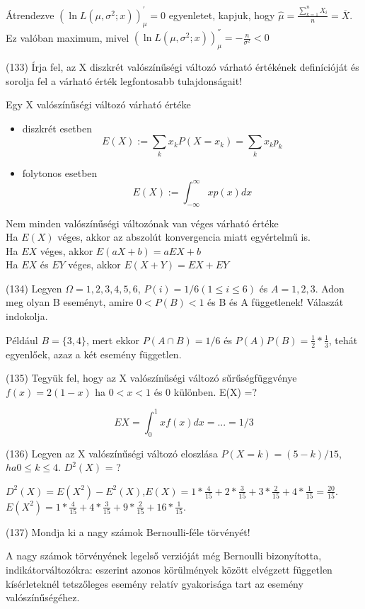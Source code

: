 \documentclass[12p]{article}
\begin{document}
Átrendezve $(\ln L(\mu,\sigma^2;x))^{'}_{\mu} = 0$ egyenletet, kapjuk, hogy $\displaystyle{\hat{\mu} = \frac{\sum^n_{k=1} X_i}{n} = \overline{X}}$. Ez valóban maximum, mivel $(\ln L(\mu,\sigma^2;x))^{''}_{\mu} = -\frac{n}{\sigma^2} < 0$

(133) Írja fel, az X diszkrét valószínűségi változó várható értékének definícióját és sorolja fel
a várható érték legfontosabb tulajdonságait!

Egy X valószínűségi változó várható értéke

\begin{itemize}
	\item diszkrét esetben
		$$E(X) := \sum_k x_k P(X = x_k) = \sum_k x_k p_k$$
		
	\item folytonos esetben
		$$E(X) := \int_{-\infty}^\infty xp(x)dx$$
\end{itemize}

Nem minden valószínűségi változónak van véges várható értéke\\
Ha $E(X)$ véges, akkor az abszolút konvergencia miatt egyértelmű is.\\
Ha $EX$ véges, akkor $E(aX+b)=aEX+b$\\
Ha $EX$ és $EY$ véges, akkor $E(X+Y)=EX+EY$

(134) Legyen $\Omega = {1, 2, 3, 4, 5, 6}$, $P(i) = 1/6 (1 \leq i \leq 6)$ és $A = {1, 2, 3}$. Adon meg olyan B
eseményt, amire $0 < P(B) < 1$ és B és A függetlenek! Válaszát indokolja.

 Például $B = \{3, 4\}$, mert ekkor $P(A \cap B) = 1/6$ és $P(A)P(B) = \frac{1}{2} * \frac{1}{3}$, tehát egyenlőek, azaz a két esemény független.

(135) Tegyük fel, hogy az X valószínűségi változó sűrűségfüggvénye $f(x) = 2(1-x)$ ha $0 < x < 1$ és 0 különben. E(X) =? 

$$EX = \int^1_0 xf(x)dx = ... = 1/3$$

(136) Legyen az X valószínűségi változó eloszlása $P(X = k) = (5 - k)/15$, $ha 0 \leq k \leq 4$. $D^2(X)$ = ?

$D^2(X) = E(X^2) - E^2(X)$,$E(X) = 1 * \frac{4}{15} + 2 * \frac{3}{15} + 3 * \frac{2}{15} + 4 * \frac{1}{15} = \frac{20}{15}$.\\
$E(X^2) = 1 * \frac{4}{15} + 4 * \frac{3}{15} + 9 * \frac{2}{15} + 16 * \frac{1}{15}$.

(137) Mondja ki a nagy számok Bernoulli-féle törvényét!

A nagy számok törvényének legelső verzióját
még Bernoulli bizonyította,
indikátorváltozókra: eszerint azonos
körülmények között elvégzett független
kísérleteknél tetszőleges esemény relatív
gyakorisága tart az esemény
valószínűségéhez.
\end{document}
